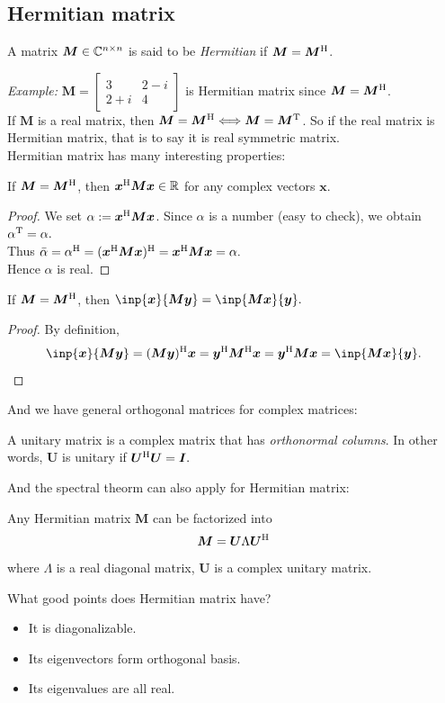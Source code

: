 \subsection{Hermitian matrix}
\begin{definition}
A matrix $\bm M\in\mathbb{C}^{n\times n}$ is said to be \emph{Hermitian} if $\bm M=\bm M^{\mathrm H}$.
\end{definition}
\emph{Example: }$\bm M=\begin{bmatrix}
3&2-i\\2+i&4
\end{bmatrix}$ is Hermitian matrix since $\bm M=\bm M^{\mathrm H}$.\\
If $\bm M$ is a real matrix, then $\bm M=\bm M^{\mathrm H}\Longleftrightarrow\bm M=\bm M^{\mathrm T}$. So if the real matrix is Hermitian matrix, that is to say it is real symmetric matrix.\\
Hermitian matrix has many interesting properties:
\begin{proposition}
If $\bm M=\bm M^{\mathrm H}$, then $\bm x^{\mathrm H}\bm M\bm x\in\mathbb{R}$ for any complex vectors $\bm x$.
\end{proposition}
\begin{proof}
We set $\alpha:=\bm x^{\mathrm H}\bm M\bm x$. Since $\alpha$ is a number (easy to check), we obtain $\alpha^{\mathrm T}=\alpha.$\\
Thus $\bar\alpha=\alpha^{\mathrm H}=(\bm x^{\mathrm H}\bm M\bm x)^{\mathrm H}=\bm x^{\mathrm H}\bm M\bm x=\alpha.$\\
Hence $\alpha$ is real.
\end{proof}
\begin{proposition}
If $\bm M=\bm M^{\mathrm H}$, then $\inp{\bm x}{\bm{My}}=\inp{\bm{Mx}}{\bm y}.$
\end{proposition}
\begin{proof}
By definition,
\[
\inp{\bm x}{\bm{My}}=(\bm{My})\Her\bm x=\bm y\Her\bm M\Her\bm x=\bm y\Her\bm M\bm x=\inp{\bm{Mx}}{\bm y}.
\]
\end{proof}
And we have general orthogonal matrices for complex matrices:
\begin{definition}[Unitary]
A unitary matrix is a complex matrix that has \emph{orthonormal columns}. In other words, $\bm U$ is unitary if $\bm U^{\mathrm H}\bm U=\bm I.$
\end{definition}
And the spectral theorm can also apply for Hermitian matrix:
\begin{theorem}
Any Hermitian matrix $\bm M$ can be factorized into
\[
\bm M=\bm U\Lambda\bm U^{\mathrm H}
\]
where $\Lambda$ is a real diagonal matrix, $\bm U$ is a complex unitary matrix.
\end{theorem}
\begin{remark}
What good points does Hermitian matrix have?
\begin{itemize}
\item
It is diagonalizable.
\item
Its eigenvectors form orthogonal basis.
\item
Its eigenvalues are all real.
\end{itemize}
\end{remark}